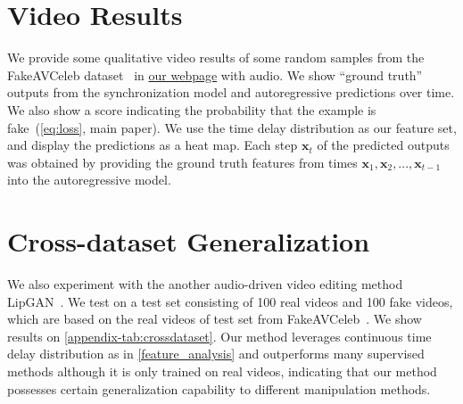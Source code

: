\documentclass[10pt,twocolumn,letterpaper]{article}
\newcommand{\bx}[0]{{\mathbf x}}
\newcommand{\supparxiv}[2]{#2}
\begin{document}
\clearpage
\appendix
\supparxiv{
\setcounter{page}{1}
\twocolumn[{\renewcommand\twocolumn[1][]{#1}\begin{center}
    \vspace{-2.0em}
    {\bf \large Supplementary Material:\\Self-Supervised Video Forensics by Audio-Visual Anomaly Detection}
    \vspace{2.0em}
\end{center}

}]

}{}


\renewcommand{\thesection}{A.\arabic{section}}
\setcounter{section}{0}


\section{Video Results}
We provide some  qualitative video results of some random samples from the FakeAVCeleb dataset~\cite{NEURIPS_DATASETS_AND_BENCHMARKS2021_d9d4f495} in \href{https://cfeng16.github.io/audio-visual-forensics/}{our webpage} with audio. We show ``ground truth'' outputs from the synchronization model and autoregressive predictions over time. We also show a score indicating the probability that the example is fake~(\cref{eq:loss}, main paper). We use the time delay distribution as our feature set, and display the predictions as a heat map. Each step $\bx_t$ of the predicted outputs was obtained by providing the ground truth features from times $\bx_1, \bx_2, ..., \bx_{t-1}$ into the autoregressive model.



\section{Cross-dataset Generalization}
\label{appendix:crossdataset}
We also experiment with the another audio-driven video editing method LipGAN~\cite{kr2019towards}. We test on a test set consisting of 100 real videos and 100 fake videos, which are based on the real videos of test set from FakeAVCeleb~\cite{NEURIPS_DATASETS_AND_BENCHMARKS2021_d9d4f495}. We show results on \cref{appendix-tab:crossdataset}. Our method leverages continuous time delay distribution as in \cref{feature_analysis} and outperforms many supervised methods although it is only trained on real videos, indicating that our method possesses certain generalization capability to different manipulation methods. 
\end{document}
